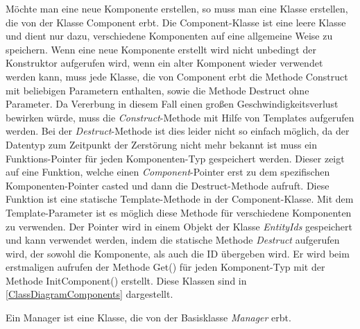 Möchte man eine neue Komponente erstellen, so muss man eine Klasse erstellen, die von der Klasse Component erbt. Die Component-Klasse ist eine leere Klasse und dient nur dazu, verschiedene Komponenten auf eine allgemeine Weise zu speichern. 
Wenn eine neue Komponente erstellt wird nicht unbedingt der Konstruktor aufgerufen wird, wenn ein alter Komponent wieder verwendet werden kann, muss jede Klasse, die von Component erbt die Methode Construct mit beliebigen Parametern enthalten, sowie die Methode Destruct ohne Parameter. 
Da Vererbung in diesem Fall einen großen Geschwindigkeitsverlust bewirken würde, muss die \textit{Construct}-Methode mit Hilfe von Templates aufgerufen werden. Bei der \textit{Destruct}-Methode ist dies leider nicht so einfach möglich, da der Datentyp zum Zeitpunkt der Zerstörung nicht mehr bekannt ist muss ein Funktions-Pointer für jeden Komponenten-Typ gespeichert werden. Dieser zeigt auf eine Funktion, welche einen \textit{Component}-Pointer erst zu dem spezifischen Komponenten-Pointer casted und dann die Destruct-Methode aufruft. Diese Funktion ist eine statische Template-Methode in der Component-Klasse. Mit dem Template-Parameter ist es möglich diese Methode für verschiedene Komponenten zu verwenden. Der Pointer wird in einem Objekt der Klasse \textit{EntityIds} gespeichert und kann verwendet werden, indem die statische Methode \textit{Destruct} aufgerufen wird, der sowohl die Komponente, als auch die ID übergeben wird. 
Er wird beim erstmaligen aufrufen der Methode Get() für jeden Komponent-Typ mit der Methode InitComponent() erstellt. Diese Klassen sind in \cref{ClassDiagramComponents} dargestellt.

Ein Manager ist eine Klasse, die von der Basisklasse \textit{Manager} erbt. 
